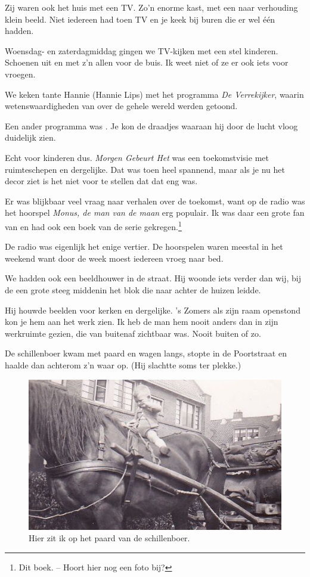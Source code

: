 \documentclass[12pt,twoside]{memoir}
\begin{document}
Zij waren ook het huis met een TV. Zo’n enorme kast, met een naar verhouding klein beeld. Niet iedereen had toen TV en je keek bij buren die er wel één hadden.

Woensdag- en zaterdagmiddag gingen we TV-kijken met een stel kinderen. Schoenen uit en met z'n allen voor de buis. Ik weet niet of ze er ook iets voor vroegen.

We keken tante Hannie (Hannie Lips) met het programma \emph{De Verrekijker}, waarin wetenswaardigheden van over de gehele wereld werden getoond. 

Een ander programma was . Je kon de draadjes waaraan hij door de lucht vloog duidelijk zien. 

Echt voor kinderen dus. \emph{Morgen Gebeurt Het} was een toekomstvisie met ruimteschepen en dergelijke. Dat was toen heel spannend, maar als je nu het decor ziet is het niet voor te stellen dat dat eng was.

Er was blijkbaar veel vraag naar verhalen over de toekomst, want op de radio was het hoorspel \emph{Monus, de man van de maan} erg populair. Ik was daar een grote fan van en had ook een boek van de serie gekregen.\footnote{Dit boek. -- Hoort hier nog een foto bij?} 

De radio was eigenlijk het enige vertier. De hoorspelen waren meestal in het weekend want door de week moest iedereen vroeg naar bed.

We hadden ook een beeldhouwer in de straat. Hij woonde iets verder dan wij, bij de een grote steeg middenin het blok die naar achter de huizen leidde.  

Hij houwde beelden voor kerken en dergelijke. 's Zomers als zijn raam openstond kon je hem aan het werk zien. Ik heb de man hem nooit anders dan in zijn werkruimte gezien, die van buitenaf zichtbaar was. Nooit buiten of zo.

De schillenboer kwam met paard en wagen langs, stopte in de Poortstraat en haalde dan achterom z’n waar op. (Hij slachtte soms ter plekke.) 

\begin{figure}
\includegraphics[width=\textwidth]{img/ch5/schillenboer}
\caption*{\footnotesize Hier zit ik op het paard van de schillenboer.}
\end{figure}
\end{document}
